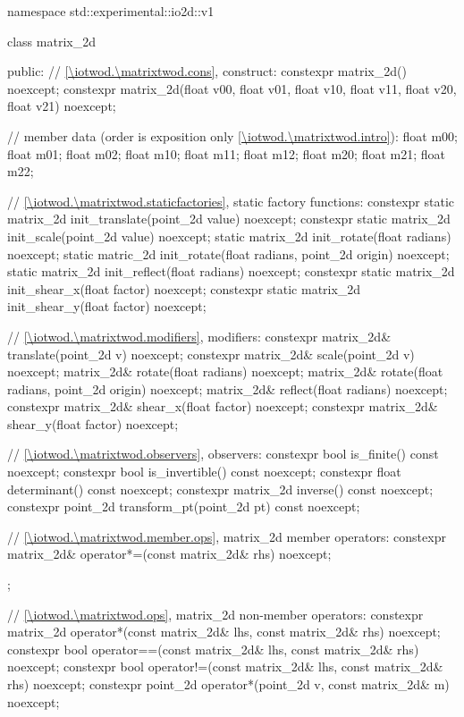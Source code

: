 \begin{codeblock}
namespace std::experimental::io2d::v1 {
  class matrix_2d {
  public:
    // \ref{\iotwod.\matrixtwod.cons}, construct:
    constexpr matrix_2d() noexcept;
    constexpr matrix_2d(float v00, float v01, float v10, float v11,
      float v20, float v21) noexcept;

    // member data (order is exposition only \ref{\iotwod.\matrixtwod.intro}):
    float m00;
    float m01;
    float m02;
    float m10;
    float m11;
    float m12;
    float m20;
    float m21;
    float m22;
    
    // \ref{\iotwod.\matrixtwod.staticfactories}, static factory functions:
    constexpr static matrix_2d init_translate(point_2d value) noexcept;
    constexpr static matrix_2d init_scale(point_2d value) noexcept;
    static matrix_2d init_rotate(float radians) noexcept;
    static matric_2d init_rotate(float radians, point_2d origin) noexcept;
    static matrix_2d init_reflect(float radians) noexcept;
    constexpr static matrix_2d init_shear_x(float factor) noexcept;
    constexpr static matrix_2d init_shear_y(float factor) noexcept;
    
    // \ref{\iotwod.\matrixtwod.modifiers}, modifiers:
    constexpr matrix_2d& translate(point_2d v) noexcept;
    constexpr matrix_2d& scale(point_2d v) noexcept;
    matrix_2d& rotate(float radians) noexcept;
    matrix_2d& rotate(float radians, point_2d origin) noexcept;
    matrix_2d& reflect(float radians) noexcept;
    constexpr matrix_2d& shear_x(float factor) noexcept;
    constexpr matrix_2d& shear_y(float factor) noexcept;
    
    // \ref{\iotwod.\matrixtwod.observers}, observers:
    constexpr bool is_finite() const noexcept;
    constexpr bool is_invertible() const noexcept;
    constexpr float determinant() const noexcept;
    constexpr matrix_2d inverse() const noexcept;
    constexpr point_2d transform_pt(point_2d pt) const noexcept;
    
    // \ref{\iotwod.\matrixtwod.member.ops}, matrix_2d member operators:
    constexpr matrix_2d& operator*=(const matrix_2d& rhs) noexcept;
  };
    
  // \ref{\iotwod.\matrixtwod.ops}, matrix_2d non-member operators:
  constexpr matrix_2d operator*(const matrix_2d& lhs, const matrix_2d& rhs)
    noexcept;
  constexpr bool operator==(const matrix_2d& lhs, const matrix_2d& rhs)
    noexcept;
  constexpr bool operator!=(const matrix_2d& lhs, const matrix_2d& rhs)
    noexcept;
  constexpr point_2d operator*(point_2d v, const matrix_2d& m) 
    noexcept;
}
\end{codeblock}

